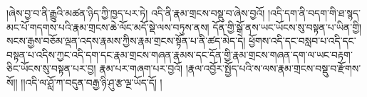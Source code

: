 །ཞེས་བྱ་བ་ནི་རྒྱུའི་མཚན་ཉིད་ཀྱི་ཁྱད་པར་ཏེ། འདི་ནི་རྣམ་གྲངས་བསྡུ་བ་ཞེས་བྱའོ། །འདི་དག་ནི་བདག་གི་ཐ་སྙད་མང་པོ་གདགས་པའི་རྣམ་གྲངས་ཆེ་ལོང་མདོ་སྡེ་ལས་བཏུས་ནས། དོན་གྱི་སྒོ་ནས་ཡང་ཡོངས་སུ་བསྟན་པ་ཡིན་གྱི། སངས་རྒྱས་བཅོམ་ལྡན་འདས་རྣམས་ཀྱིས་རྣམ་གྲངས་སྟོན་པ་ནི་ཚད་མེད་དེ། ཕྱོགས་འདི་དང་བསླབ་པ་འདི་དང་བསྟན་པ་འདིས་ཀྱང་འདི་དག་དང་རྣམ་གྲངས་གཞན་རྣམས་དང་དོན་གྱི་རྣམ་གྲངས་གཞན་དག་ལ་ཡང་བརྟག་ཅིང་ཡོངས་སུ་བསྟན་པར་བྱ། རྣམ་པར་གཞག་པར་བྱའོ། །རྣལ་འབྱོར་སྤྱོད་པའི་ས་ལས་རྣམ་གྲངས་བསྡུ་བ་རྫོགས་སོ།། །།འདི་ལ་ཤློ་ཀ་བདུན་བརྒྱ་ཉི་ཤུ་རྩ་ལྔ་ཡོད་དོ། །